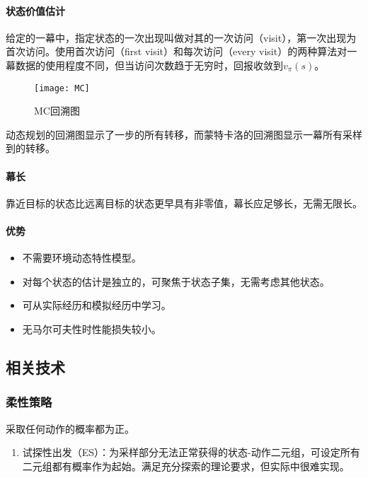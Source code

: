 \documentclass[
12pt, %
a4paper, 
oneside, %
headinclude,footinclude, %
]{scrartcl}
\begin{document}
\paragraph{状态价值估计}
给定的一幕中，指定状态的一次出现叫做对其的一次访问（visit），第一次出现为首次访问。使用首次访问（first visit）和每次访问（every visit）的两种算法对一幕数据的使用程度不同，但当访问次数趋于无穷时，回报收敛到$ v_{\pi}(s) $。

\begin{figure}[H]
\centering 
\texttt{[image: MC]} 
\caption[MC回溯图]{MC回溯图}
\end{figure}

动态规划的回溯图显示了一步的所有转移，而蒙特卡洛的回溯图显示一幕所有采样到的转移。
\paragraph{幕长}
靠近目标的状态比远离目标的状态更早具有非零值，幕长应足够长，无需无限长。
\paragraph{优势}
\begin{itemize}
\item 不需要环境动态特性模型。
\item 对每个状态的估计是独立的，可聚焦于状态子集，无需考虑其他状态。
\item 可从实际经历和模拟经历中学习。
\item 无马尔可夫性时性能损失较小。
\end{itemize}
\subsection{相关技术}
\subsubsection{柔性策略}
采取任何动作的概率都为正。
\begin{enumerate}
\item 试探性出发（ES）：为采样部分无法正常获得的状态-动作二元组，可设定所有二元组都有概率作为起始。满足充分探索的理论要求，但实际中很难实现。
\end{enumerate}
\end{document}
